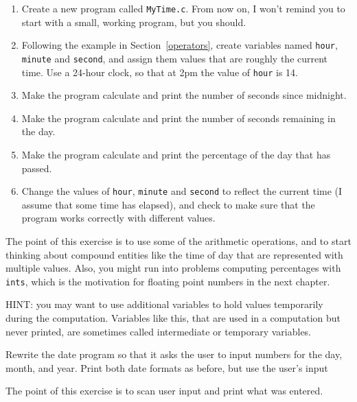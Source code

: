 \begin{exercise}

\begin{enumerate}

\item Create a new program called {\tt MyTime.c}.  From now
on, I won't remind you to start with a small, working program,
but you should.

\item Following the example in Section~\ref{operators}, create variables
named {\tt hour}, {\tt minute} and {\tt second}, and assign
them values that are roughly the current time.  Use a 24-hour
clock, so that at 2pm the value of {\tt hour} is 14.

\item Make the program calculate and print the number of
seconds since midnight.

\item Make the program calculate and print the number of
seconds remaining in the day.

\item Make the program calculate and print the percentage of
the day that has passed.

\item Change the values of {\tt hour}, {\tt minute} and {\tt second}
to reflect the current time (I assume that some time has elapsed), and
check to make sure that the program works correctly with different
values.

\end{enumerate}

The point of this exercise is to use some of the arithmetic
operations, and to start thinking about compound entities like the
time of day that are represented with multiple values.  Also,
you might run into problems computing percentages with {\tt ints},
which is the motivation for floating point numbers in the next
chapter.

HINT: you may want to use additional variables to hold values
temporarily during the computation.  Variables like this, that
are used in a computation but never printed, are sometimes called
intermediate or temporary variables.

\end{exercise}


\begin{exercise}
	
Rewrite the date program so that it asks the user to input numbers for the day, month, and year. 
Print both date formats as before, but use the user's input		
		

The point of this exercise is to scan user input and print what was entered.
\end{exercise}
